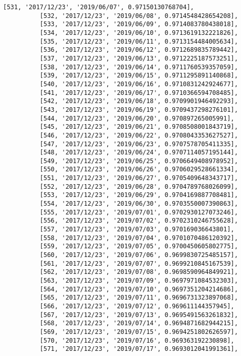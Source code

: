 \documentclass[11pt]{article}
\begin{document}
\begin{Verbatim}[commandchars=\\\{\}]
          [531, '2017/12/23', '2019/06/07', 0.97150130768704],
          [532, '2017/12/23', '2019/06/08', 0.9714548428654208],
          [533, '2017/12/23', '2019/06/09', 0.9714083780438018],
          [534, '2017/12/23', '2019/06/10', 0.9713619132221826],
          [535, '2017/12/23', '2019/06/11', 0.9713154484005634],
          [536, '2017/12/23', '2019/06/12', 0.9712689835789442],
          [537, '2017/12/23', '2019/06/13', 0.9712225187573251],
          [538, '2017/12/23', '2019/06/14', 0.9711760539357059],
          [539, '2017/12/23', '2019/06/15', 0.9711295891140868],
          [540, '2017/12/23', '2019/06/16', 0.9710831242924677],
          [541, '2017/12/23', '2019/06/17', 0.9710366594708485],
          [542, '2017/12/23', '2019/06/18', 0.9709901946492293],
          [543, '2017/12/23', '2019/06/19', 0.9709437298276101],
          [544, '2017/12/23', '2019/06/20', 0.970897265005991],
          [545, '2017/12/23', '2019/06/21', 0.9708508001843719],
          [546, '2017/12/23', '2019/06/22', 0.9708043353627527],
          [547, '2017/12/23', '2019/06/23', 0.9707578705411335],
          [548, '2017/12/23', '2019/06/24', 0.9707114057195144],
          [549, '2017/12/23', '2019/06/25', 0.9706649408978952],
          [550, '2017/12/23', '2019/06/26', 0.9706029528661334],
          [551, '2017/12/23', '2019/06/27', 0.9705409648343717],
          [552, '2017/12/23', '2019/06/28', 0.9704789768026099],
          [553, '2017/12/23', '2019/06/29', 0.9704169887708481],
          [554, '2017/12/23', '2019/06/30', 0.9703550007390863],
          [555, '2017/12/23', '2019/07/01', 0.9702930127073246],
          [556, '2017/12/23', '2019/07/02', 0.9702310246755628],
          [557, '2017/12/23', '2019/07/03', 0.970169036643801],
          [558, '2017/12/23', '2019/07/04', 0.9701070486120392],
          [559, '2017/12/23', '2019/07/05', 0.9700450605802775],
          [560, '2017/12/23', '2019/07/06', 0.9699830725485157],
          [561, '2017/12/23', '2019/07/07', 0.9699210845167539],
          [562, '2017/12/23', '2019/07/08', 0.9698590964849921],
          [563, '2017/12/23', '2019/07/09', 0.9697971084532303],
          [564, '2017/12/23', '2019/07/10', 0.9697351204214686],
          [565, '2017/12/23', '2019/07/11', 0.9696731323897068],
          [566, '2017/12/23', '2019/07/12', 0.969611144357945],
          [567, '2017/12/23', '2019/07/13', 0.9695491563261832],
          [568, '2017/12/23', '2019/07/14', 0.9694871682944215],
          [569, '2017/12/23', '2019/07/15', 0.9694251802626597],
          [570, '2017/12/23', '2019/07/16', 0.969363192230898],
          [571, '2017/12/23', '2019/07/17', 0.9693012041991361],

\end{Verbatim}
\end{document}
